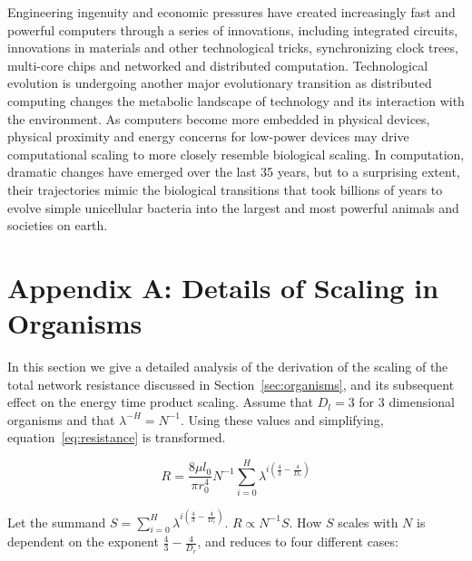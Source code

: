 \documentclass[12pt]{article}
\begin{document}
Engineering ingenuity and economic pressures have created increasingly
fast and powerful computers through a series of innovations, including
integrated circuits, innovations in materials and other technological
tricks, synchronizing clock trees, multi-core chips and networked and
distributed computation. Technological evolution is undergoing another
major evolutionary transition as distributed computing changes the
metabolic landscape of technology and its interaction with the
environment. As computers become more embedded in physical devices,
physical proximity and energy concerns for low-power devices may drive
computational scaling to more closely resemble biological scaling. In
computation, dramatic changes have emerged over the last 35 years, but
to a surprising extent, their trajectories mimic the biological
transitions that took billions of years to evolve simple unicellular
bacteria into the largest and most powerful animals and societies on
earth.




\section{Appendix A: Details of Scaling in Organisms}
\label{sec:AppendixOrg}

In this section we give a detailed analysis of the derivation of the scaling
of the total network resistance discussed in Section~\ref{sec:organisms}, and its
subsequent effect on the energy time product scaling. Assume that $D_l = 3$
for $3$ dimensional organisms and that $\lambda^{-H}=N^{-1}$.  Using these
values and simplifying, equation~\ref{eq:resistance} is transformed. 

\begin{equation}
 R = \frac{8 \mu l_0}{\pi r_0^4} N^{-1} \sum_{i=0}^H \lambda^{i(\frac{4}{3} -\frac{4}{D_r})}
\end{equation}

Let the summand $S = \sum_{i=0}^H \lambda^{i(\frac{4}{3} -\frac{4}{D_r})}$. $R \propto
N^{-1} S$. How $S$ scales with $N$ is dependent on the exponent $\frac{4}{3} -
\frac{4}{D_r}$, and reduces to four different cases:
\end{document}
